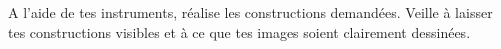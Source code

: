 %
%
A l'aide de tes instruments, réalise les constructions demandées.
    Veille à laisser tes constructions visibles et à ce que tes images
    soient clairement dessinées.
